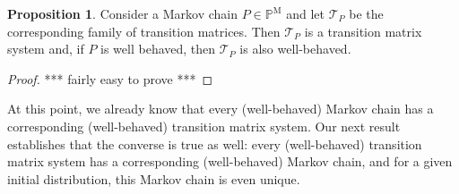 \documentclass[10pt]{paper}
\theoremstyle{definition}
\newtheorem{proposition}[theorem]{Proposition}
\newcommand{\processes}{\mathbb{P}}
\newcommand{\mprocesses}{\processes^{\mathrm{M}}}
\begin{document}
\begin{proposition}\label{prop:Markovhassystem}
Consider a Markov chain $P\in\mprocesses$ and let $\mathcal{T}_P$ be the corresponding family of transition matrices. Then $\mathcal{T}_P$ is a transition matrix system and, if $P$ is well behaved, then $\mathcal{T}_P$ is also well-behaved.
\end{proposition}
\begin{proof}
*** fairly easy to prove ***
\end{proof}

At this point, we already know that every (well-behaved) Markov chain has a corresponding (well-behaved) transition matrix system. Our next result establishes that the converse is true as well: every (well-behaved) transition matrix system has a corresponding (well-behaved) Markov chain, and for a given initial distribution, this Markov chain is even unique.
\end{document}
